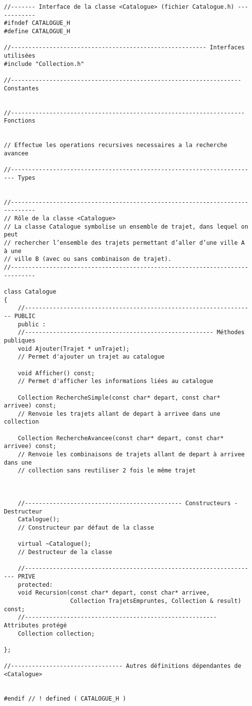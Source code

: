 \begin{verbatim}
//------- Interface de la classe <Catalogue> (fichier Catalogue.h) ------------
#ifndef CATALOGUE_H
#define CATALOGUE_H

//-------------------------------------------------------- Interfaces utilisées
#include "Collection.h"

//------------------------------------------------------------------ Constantes


//------------------------------------------------------------------- Fonctions


// Effectue les operations recursives necessaires a la recherche avancee

//----------------------------------------------------------------------- Types


//-----------------------------------------------------------------------------
// Rôle de la classe <Catalogue>
// La classe Catalogue symbolise un ensemble de trajet, dans lequel on peut
// rechercher l’ensemble des trajets permettant d’aller d’une ville A à une
// ville B (avec ou sans combinaison de trajet).
//-----------------------------------------------------------------------------

class Catalogue
{
    //------------------------------------------------------------------ PUBLIC
    public :
    //------------------------------------------------------ Méthodes publiques
    void Ajouter(Trajet * unTrajet);
    // Permet d'ajouter un trajet au catalogue
    
    void Afficher() const;
    // Permet d'afficher les informations liées au catalogue
    
    Collection RechercheSimple(const char* depart, const char* arrivee) const;
    // Renvoie les trajets allant de depart à arrivee dans une collection
    
    Collection RechercheAvancee(const char* depart, const char* arrivee) const;
    // Renvoie les combinaisons de trajets allant de depart à arrivee dans une
    // collection sans reutiliser 2 fois le même trajet

    

    //--------------------------------------------- Constructeurs - Destructeur
    Catalogue();
    // Constructeur par défaut de la classe
    
    virtual ~Catalogue();
    // Destructeur de la classe
    
    //------------------------------------------------------------------- PRIVE
    protected:
    void Recursion(const char* depart, const char* arrivee,
                   Collection TrajetsEmpruntes, Collection & result) const;
    //------------------------------------------------------- Attributes protégé
    Collection collection;

};

//-------------------------------- Autres définitions dépendantes de <Catalogue>


#endif // ! defined ( CATALOGUE_H )
\end{verbatim}
